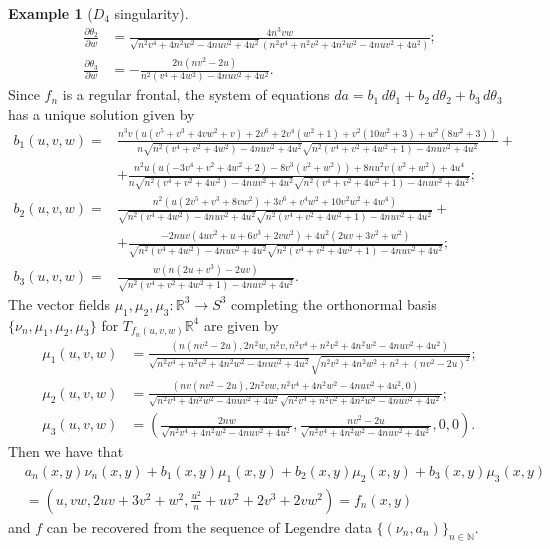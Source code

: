 \documentclass{amsart}
\theoremstyle{definition}
\theoremstyle{definition}
\newtheorem{example}{Example}
\theoremstyle{definition}
\newcommand{\mb}{\mathbb}
\begin{document}
{\begin{example}[$D_4$ singularity]
\begin{align*}
	\frac{\partial \theta_2}{\partial w}&=\frac{4 n^3 v w}{\sqrt{n^2 v^4+4 n^2 w^2-4 n u v^2+4 u^2} \left(n^2 v^4+n^2 v^2+4 n^2 w^2-4 n u v^2+4 u^2\right)};
	\\
	\frac{\partial \theta_3}{\partial w}&=-\frac{2 n \left(n v^2-2 u\right)}{n^2 \left(v^4+4 w^2\right)-4 n u v^2+4 u^2}.
\end{align*}
Since $f_n$ is a regular frontal, the system of equations $da=b_1\,d\theta_1+b_2\,d\theta_2+b_3\,d\theta_3$ has a unique solution given by
\begin{align*}
	b_1(u,v,w)=&\frac{n^3 v \left(u \left(v^5+v^3+4 v w^2+v\right)+2 v^6+2 v^4 \left(w^2+1\right)+v^2 \left(10 w^2+3\right)+w^2 \left(8 w^2+3\right)\right)}{n \sqrt{n^2 \left(v^4+v^2+4 w^2\right)-4 n u v^2+4 u^2} \sqrt{n^2 \left(v^4+v^2+4 w^2+1\right)-4 n u v^2+4 u^2}}+\\
		&+\frac{n^2 u \left(u \left(-3 v^4+v^2+4 w^2+2\right)-8 v^3 \left(v^2+w^2\right)\right)+8 n u^2 v \left(v^2+w^2\right)+4 u^4}{n \sqrt{n^2 \left(v^4+v^2+4 w^2\right)-4 n u v^2+4 u^2} \sqrt{n^2 \left(v^4+v^2+4 w^2+1\right)-4 n u v^2+4 u^2}};\\
	b_2(u,v,w)=&\frac{n^2 \left(u \left(2 v^5+v^3+8 v w^2\right)+3 v^6+v^4 w^2+10 v^2 w^2+4 w^4\right)}{\sqrt{n^2 \left(v^4+4 w^2\right)-4 n u v^2+4 u^2} \sqrt{n^2 \left(v^4+v^2+4 w^2+1\right)-4 n u v^2+4 u^2}}+\\
			&+\frac{-2 n u v \left(4 u v^2+u+6 v^3+2 v w^2\right)+4 u^2 \left(2 u v+3 v^2+w^2\right)}{\sqrt{n^2 \left(v^4+4 w^2\right)-4 n u v^2+4 u^2} \sqrt{n^2 \left(v^4+v^2+4 w^2+1\right)-4 n u v^2+4 u^2}};\\
	b_3(u,v,w)=&\frac{w \left(n \left(2 u+v^3\right)-2 u v\right)}{\sqrt{n^2 \left(v^4+v^2+4 w^2+1\right)-4 n u v^2+4 u^2}}.
\end{align*}
The vector fields $\mu_1, \mu_2,\mu_3\colon \mb{R}^3 \to S^3$ completing the orthonormal basis $\{\nu_n,\mu_1,\mu_2,\mu_3\}$ for $T_{f_n(u,v,w)}\mb{R}^4$ are given by
\begin{align*}
	\mu_1(u,v,w)&=\frac{(n(nv^2-2u),2n^2w,n^2v,n^2 v^4+n^2 v^2+4 n^2 w^2-4 n u v^2+4 u^2)}{\sqrt{n^2 v^4+n^2 v^2+4 n^2 w^2-4 n u v^2+4 u^2} \sqrt{n^2 v^2+4 n^2 w^2+n^2+\left(n v^2-2 u\right)^2}};
		\\
	\mu_2(u,v,w)&=\frac{(n v (n v^2-2 u),2n^2 vw,n^2 v^4+4 n^2 w^2-4 n u v^2+4 u^2,0)}{\sqrt{n^2 v^4+4 n^2 w^2-4 n u v^2+4 u^2} \sqrt{n^2 v^4+n^2 v^2+4 n^2 w^2-4 n u v^2+4 u^2}};
\\
	\mu_3(u,v,w)&=\left(\frac{2 n w}{\sqrt{n^2 v^4+4 n^2 w^2-4 n u v^2+4 u^2}},\frac{n v^2-2 u}{\sqrt{n^2 v^4+4 n^2 w^2-4 n u v^2+4 u^2}},0,0\right).
\end{align*}
Then we have that
\begin{align*}
	&a_n(x,y)\nu_n(x,y)+b_1(x,y)\mu_1(x,y)+b_2(x,y)\mu_2(x,y)+b_3(x,y)\mu_3(x,y)
	\\
	&=\left(u,v w,2 u v+3 v^2+w^2,\frac{u^2}{n}+u v^2+2 v^3+2 v w^2\right)=f_n(x,y)
\end{align*}
and $f$ can be recovered from the sequence of Legendre data $\{(\nu_n,a_n)\}_{n \in \mb{N}}$.
\end{example}


}
\end{document}
